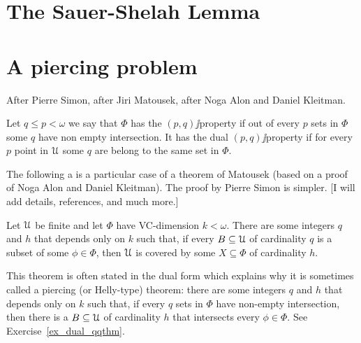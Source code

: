 \documentclass[combinatorics.tex]{subfiles}
\begin{document}
\chapter{The Sauer-Shelah Lemma}
\label{combinatorics}

\def\vc{{\footnotesize VC}}
\def\nip{{\footnotesize NIP}}


\def\medrel#1{\parbox[t]{6ex}{$\displaystyle\hfil #1$}}
\def\ceq#1#2#3{\parbox[t]{25ex}{$\displaystyle #1$}\medrel{#2}{$\displaystyle #3$}}

\def\mr{\color{brown}}
\def\gr{\color{green}}

\chapter{A piercing problem}\label{qq}

After Pierre Simon, after Jiri Matousek, after Noga Alon and Daniel Kleitman.

Let $q\le p<\omega$ we say that $\Phi$ has the $(p,q)\jj$property if out of every $p$ sets in $\Phi$ some $q$ have non empty intersection.
It has the dual $(p,q)\jj$property if for every $p$ point in $\EuScript U$ some $q$ are belong to the same set in $\Phi$.


The following a is a particular case of a theorem of  Matousek (based on a proof of Noga Alon and Daniel Kleitman).
The proof by Pierre Simon is simpler.
[I will add details, references, and much more.]

\begin{theorem}\label{thm_qq}
Let $\EuScript U$ be finite and let $\Phi$ have \vc-dimension $k<\omega$.
There are some integers $q$ and $h$ that depends only on $k$ such that, if every $B\subseteq\EuScript U$ of cardinality $q$ is a subset of some $\phi\in\Phi$, then $\EuScript U$ is covered by some $X\subseteq\Phi$ of cardinality $h$.
\end{theorem}

This theorem is often stated in the dual form which explains why it is sometimes called a piercing (or Helly-type) theorem: there are some integers $q$ and $h$ that depends only on $k$ such that, if every $q$ sets in $\Phi$ have non-empty intersection, then there is a $B\subseteq\EuScript U$ of cardinality $h$ that intersects every $\phi\in\Phi$.
See Exercise~\ref{ex_dual_qqthm}.
\end{document}
